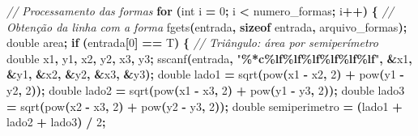 \documentclass[
  11pt,
  a4paper,
]{scrbook}
\newenvironment{Shaded}{\begin{snugshade}}{\end{snugshade}}
\newcommand{\CharTok}[1]{\textcolor[rgb]{0.31,0.60,0.02}{#1}}
\newcommand{\CommentTok}[1]{\textcolor[rgb]{0.56,0.35,0.01}{\textit{#1}}}
\newcommand{\ControlFlowTok}[1]{\textcolor[rgb]{0.13,0.29,0.53}{\textbf{#1}}}
\newcommand{\DataTypeTok}[1]{\textcolor[rgb]{0.13,0.29,0.53}{#1}}
\newcommand{\DecValTok}[1]{\textcolor[rgb]{0.00,0.00,0.81}{#1}}
\newcommand{\KeywordTok}[1]{\textcolor[rgb]{0.13,0.29,0.53}{\textbf{#1}}}
\newcommand{\NormalTok}[1]{#1}
\newcommand{\OperatorTok}[1]{\textcolor[rgb]{0.81,0.36,0.00}{\textbf{#1}}}
\newcommand{\SpecialCharTok}[1]{\textcolor[rgb]{0.81,0.36,0.00}{\textbf{#1}}}
\newcommand{\StringTok}[1]{\textcolor[rgb]{0.31,0.60,0.02}{#1}}
\begin{document}
\begin{Shaded}
\begin{Highlighting}[]
        \CommentTok{// Processamento das formas}
        \ControlFlowTok{for} \OperatorTok{(}\DataTypeTok{int}\NormalTok{ i }\OperatorTok{=} \DecValTok{0}\OperatorTok{;}\NormalTok{ i }\OperatorTok{\textless{}}\NormalTok{ numero\_formas}\OperatorTok{;}\NormalTok{ i}\OperatorTok{++)} \OperatorTok{\{}
            \CommentTok{// Obtenção da linha com a forma}
\NormalTok{            fgets}\OperatorTok{(}\NormalTok{entrada}\OperatorTok{,} \KeywordTok{sizeof}\NormalTok{ entrada}\OperatorTok{,}\NormalTok{ arquivo\_formas}\OperatorTok{);}
            \DataTypeTok{double}\NormalTok{ area}\OperatorTok{;}
            \ControlFlowTok{if} \OperatorTok{(}\NormalTok{entrada}\OperatorTok{[}\DecValTok{0}\OperatorTok{]} \OperatorTok{==} \CharTok{\textquotesingle{}T\textquotesingle{}}\OperatorTok{)} \OperatorTok{\{}
                \CommentTok{// Triângulo: área por semiperímetro}
                \DataTypeTok{double}\NormalTok{ x1}\OperatorTok{,}\NormalTok{ y1}\OperatorTok{,}\NormalTok{ x2}\OperatorTok{,}\NormalTok{ y2}\OperatorTok{,}\NormalTok{ x3}\OperatorTok{,}\NormalTok{ y3}\OperatorTok{;}
\NormalTok{                sscanf}\OperatorTok{(}\NormalTok{entrada}\OperatorTok{,} \StringTok{"}\SpecialCharTok{\%*c\%lf\%lf\%lf\%lf\%lf\%lf}\StringTok{"}\OperatorTok{,}
                       \OperatorTok{\&}\NormalTok{x1}\OperatorTok{,} \OperatorTok{\&}\NormalTok{y1}\OperatorTok{,} \OperatorTok{\&}\NormalTok{x2}\OperatorTok{,} \OperatorTok{\&}\NormalTok{y2}\OperatorTok{,} \OperatorTok{\&}\NormalTok{x3}\OperatorTok{,} \OperatorTok{\&}\NormalTok{y3}\OperatorTok{);}
                \DataTypeTok{double}\NormalTok{ lado1 }\OperatorTok{=}\NormalTok{ sqrt}\OperatorTok{(}\NormalTok{pow}\OperatorTok{(}\NormalTok{x1 }\OperatorTok{{-}}\NormalTok{ x2}\OperatorTok{,} \DecValTok{2}\OperatorTok{)} \OperatorTok{+}\NormalTok{ pow}\OperatorTok{(}\NormalTok{y1 }\OperatorTok{{-}}\NormalTok{ y2}\OperatorTok{,} \DecValTok{2}\OperatorTok{));}
                \DataTypeTok{double}\NormalTok{ lado2 }\OperatorTok{=}\NormalTok{ sqrt}\OperatorTok{(}\NormalTok{pow}\OperatorTok{(}\NormalTok{x1 }\OperatorTok{{-}}\NormalTok{ x3}\OperatorTok{,} \DecValTok{2}\OperatorTok{)} \OperatorTok{+}\NormalTok{ pow}\OperatorTok{(}\NormalTok{y1 }\OperatorTok{{-}}\NormalTok{ y3}\OperatorTok{,} \DecValTok{2}\OperatorTok{));}
                \DataTypeTok{double}\NormalTok{ lado3 }\OperatorTok{=}\NormalTok{ sqrt}\OperatorTok{(}\NormalTok{pow}\OperatorTok{(}\NormalTok{x2 }\OperatorTok{{-}}\NormalTok{ x3}\OperatorTok{,} \DecValTok{2}\OperatorTok{)} \OperatorTok{+}\NormalTok{ pow}\OperatorTok{(}\NormalTok{y2 }\OperatorTok{{-}}\NormalTok{ y3}\OperatorTok{,} \DecValTok{2}\OperatorTok{));}
                \DataTypeTok{double}\NormalTok{ semiperimetro }\OperatorTok{=} \OperatorTok{(}\NormalTok{lado1 }\OperatorTok{+}\NormalTok{ lado2 }\OperatorTok{+}\NormalTok{ lado3}\OperatorTok{)} \OperatorTok{/} \DecValTok{2}\OperatorTok{;}


\end{Highlighting}
\end{Shaded}
\end{document}
